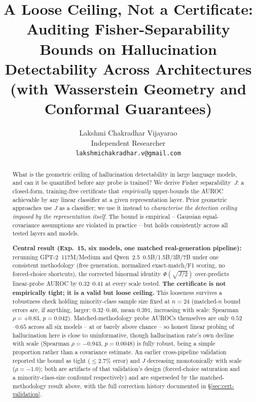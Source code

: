 \documentclass[10pt,twocolumn]{article}
\title{\textbf{A Loose Ceiling, Not a Certificate: Auditing Fisher-Separability\\
Bounds on Hallucination Detectability Across Architectures\\
\large{(with Wasserstein Geometry and Conformal Guarantees)}}}
\author{
  Lakshmi Chakradhar Vijayarao \\
  Independent Researcher \\
  \texttt{lakshmichakradhar.v@gmail.com}
}
\date{}
\begin{document}
\maketitle

\begin{abstract}
What is the geometric ceiling of hallucination detectability in large
language models, and can it be quantified before any probe is trained?
We derive Fisher separability~$J$: a closed-form, training-free
certificate that \emph{empirically} upper-bounds the AUROC achievable
by any linear classifier at a given representation layer. Prior
geometric approaches use $J$ as a classifier; we use it instead to
\emph{characterise the detection ceiling imposed by the representation
itself}. The bound is empirical -- Gaussian equal-covariance
assumptions are violated in practice -- but holds consistently across
all tested layers and models.

\textbf{Central result (Exp.~15, six models, one matched
real-generation pipeline):} rerunning GPT-2~117M/Medium and
Qwen~2.5~0.5B/1.5B/3B/7B under one consistent methodology (free
generation, normalized exact-match/F1 scoring, no forced-choice
shortcuts), the corrected binormal identity $\Phi(\sqrt{J/2})$
over-predicts linear-probe AUROC by $0.32$--$0.41$ at every scale
tested. \textbf{The certificate is not empirically tight; it is a
valid but loose ceiling.} This looseness survives a robustness check
holding minority-class sample size fixed at $n=24$ (matched-$n$ bound
errors are, if anything, larger: $0.32$--$0.46$, mean $0.391$,
increasing with scale: Spearman $\rho={+}0.83$, $p=0.042$).
Matched-methodology probe AUROCs themselves are only $0.52$--$0.65$
across all six models -- at or barely above chance -- so honest linear
probing of hallucination here is close to uninformative, though
hallucination rate's own decline with scale (Spearman $\rho=-0.943$,
$p=0.0048$) is fully robust, being a simple proportion rather than a
covariance estimate. An earlier cross-pipeline validation reported the
bound as tight ($\leq2.7\%$ error) and $J$ decreasing monotonically
with scale ($\rho=-1.0$); both are artifacts of that validation's
design (forced-choice saturation and a minority-class-size confound
respectively) and are superseded by the matched-methodology result
above, with the full correction history documented in
\S\ref{sec:cert-validation}.


\end{abstract}
\end{document}
